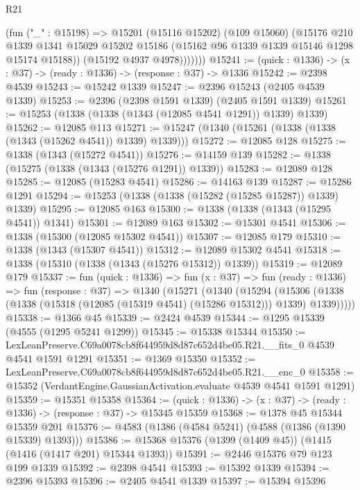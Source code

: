 \begin{lexlean}{R21}
\begin{coremodule}
              (fun ("_" : @15198) =>
              @15201
                (@15116 @15202)
                (@109 @15060)
                (@15176
                  @210
                  @1339
                  @1341
                  @15029
                  @15202
                  @15186
                  (@15162 @96 @1339 @1339 @15146 @1298 @15174 @15188))
                (@15192 @4937 @4978)))))))
@15241 := (quick : @1336) -> (x : @37) -> (ready : @1336) -> (response : @37) -> @1336
@15242 := @2398 @4539
@15243 := @15242 @1339
@15247 := @2396 @15243 (@2405 @4539 @1339)
@15253 := @2396 (@2398 @1591 @1339) (@2405 @1591 @1339)
@15261 := @15253 (@1338 (@1338 (@1343 (@12085 @4541 @1291)) @1339) @1339)
@15262 := @12085 @113
@15271 := @15247 (@1340 (@15261 (@1338 (@1338 (@1343 (@15262 @4541)) @1339) @1339)))
@15272 := @12085 @128
@15275 := @1338 (@1343 (@15272 @4541))
@15276 := @14159 @139
@15282 := @1338 (@15275 (@1338 (@1343 (@15276 @1291)) @1339))
@15283 := @12089 @128
@15285 := @12085 (@15283 @4541)
@15286 := @14163 @139
@15287 := @15286 @1291
@15294 := @15253 (@1338 (@1338 (@15282 (@15285 @15287)) @1339) @1339)
@15295 := @12085 @163
@15300 := @1338 (@1338 (@1343 (@15295 @4541)) @1341)
@15301 := @12089 @163
@15302 := @15301 @4541
@15306 := @1338 (@15300 (@12085 @15302 @4541))
@15307 := @12085 @179
@15310 := @1338 (@1343 (@15307 @4541))
@15312 := @12089 @15302 @4541
@15318 := @1338 (@15310 (@1338 (@1343 (@15276 @15312)) @1339))
@15319 := @12089 @179
@15337 := fun (quick : @1336) =>
  fun (x : @37) =>
  fun (ready : @1336) =>
  fun (response : @37) =>
  @1340
    (@15271
      (@1340
        (@15294
          (@15306 (@1338 (@1338 (@15318 (@12085 (@15319 @4541) (@15286 @15312))) @1339) @1339)))))
@15338 := @1366 @45
@15339 := @2424 @4539
@15344 := @1295 @15339 (@4555 (@1295 @5241 @1299))
@15345 := @15338 @15344
@15350 := LexLeanPreserve.C69a0078cb8f644959d8d87c652d4be05.R21.__fits_0 @4539 @4541 @1591 @1291
@15351 := @1369 @15350
@15352 := LexLeanPreserve.C69a0078cb8f644959d8d87c652d4be05.R21.__enc_0
@15358 := @15352 (VerdantEngine.GaussianActivation.evaluate @4539 @4541 @1591 @1291)
@15359 := @15351 @15358
@15364 := (quick : @1336) -> (x : @37) -> (ready : @1336) -> (response : @37) -> @15345 @15359
@15368 := @1378 @45 @15344 @15359 @201
@15376 := @4583 (@1386 (@4584 @5241) (@4588 (@1386 (@1390 @15339) @1393)))
@15386 := @15368 @15376 (@1399 (@1409 @45)) (@1415 (@1416 (@1417 @201) @15344 @1393))
@15391 := @2446 @15376 @79 @123 @199 @1339
@15392 := @2398 @4541
@15393 := @15392 @1339
@15394 := @2396 @15393
@15396 := @2405 @4541 @1339
@15397 := @15394 @15396

\end{coremodule}
\end{lexlean}

